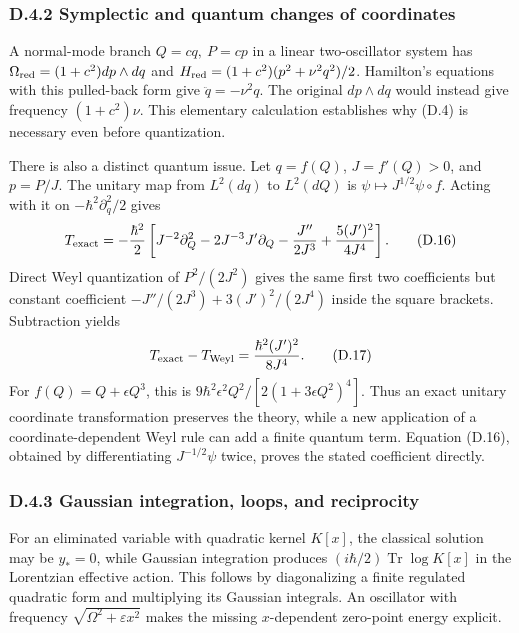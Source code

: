 \hypertarget{d.4.2-symplectic-and-quantum-changes-of-coordinates}{%
\subsubsection{D.4.2 Symplectic and quantum changes of coordinates}\label{d.4.2-symplectic-and-quantum-changes-of-coordinates}}

A normal-mode branch \(Q=cq,\ P=cp\) in a linear two-oscillator system has \(\Omega_{\rm red}=(1+c^2)dp\wedge dq\) and \(H_{\rm red}=(1+c^2)(p^2+\nu^2q^2)/2\). Hamilton's equations with this pulled-back form give \(\ddot q=-\nu^2q\). The original \(dp\wedge dq\) would instead give frequency \((1+c^2)\nu\). This elementary calculation establishes why (D.4) is necessary even before quantization.

There is also a distinct quantum issue. Let \(q=f(Q)\), \(J=f'(Q)>0\), and \(p=P/J\). The unitary map from \(L^2(dq)\) to \(L^2(dQ)\) is \(\psi\mapsto J^{1/2}\psi\circ f\). Acting with it on \(-\hbar^2\partial_q^2/2\) gives \[
T_{\rm exact}=-\frac{\hbar^2}{2}
\left[J^{-2}\partial_Q^2-2J^{-3}J'\partial_Q
-\frac{J''}{2J^3}+\frac{5(J')^2}{4J^4}\right].
\tag{D.16}
\] Direct Weyl quantization of \(P^2/(2J^2)\) gives the same first two coefficients but constant coefficient \(-J''/(2J^3)+3(J')^2/(2J^4)\) inside the square brackets. Subtraction yields \[
T_{\rm exact}-T_{\rm Weyl}
=\frac{\hbar^2(J')^2}{8J^4}.
\tag{D.17}
\] For \(f(Q)=Q+\epsilon Q^3\), this is \(9\hbar^2\epsilon^2Q^2/[2(1+3\epsilon Q^2)^4]\). Thus an exact unitary coordinate transformation preserves the theory, while a new application of a coordinate-dependent Weyl rule can add a finite quantum term. Equation (D.16), obtained by differentiating \(J^{-1/2}\psi\) twice, proves the stated coefficient directly.

\hypertarget{d.4.3-gaussian-integration-loops-and-reciprocity}{%
\subsubsection{D.4.3 Gaussian integration, loops, and reciprocity}\label{d.4.3-gaussian-integration-loops-and-reciprocity}}

For an eliminated variable with quadratic kernel \(K[x]\), the classical solution may be \(y_*=0\), while Gaussian integration produces \((i\hbar/2)\operatorname{Tr}\log K[x]\) in the Lorentzian effective action. This follows by diagonalizing a finite regulated quadratic form and multiplying its Gaussian integrals. An oscillator with frequency \(\sqrt{\Omega^2+\varepsilon x^2}\) makes the missing \(x\)-dependent zero-point energy explicit.

